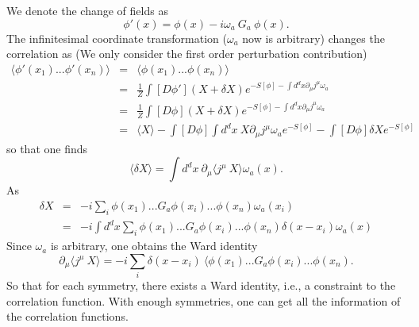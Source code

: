\documentclass[submission, PhysLectNotes]{SciPost}
\begin{document}
We denote the change of fields as
\begin{equation}
    \phi'(x) = \phi(x) -i\omega_a\ G_a\ \phi(x).
\end{equation}
The infinitesimal coordinate transformation ($\omega_a$ now is arbitrary) changes the correlation as (We only consider the first order perturbation contribution)
\begin{eqnarray}
\langle \phi'(x_1)... \phi'(x_n)\rangle &=& \langle \phi(x_1)... \phi(x_n)\rangle \\
&=& \frac{1}{Z} \int [D\phi'] (X+\delta X) e^{-S[\phi] - \int d^dx\partial_\mu j^\mu \omega_a} \\
&=& \frac{1}{Z} \int [D\phi] (X+\delta X) e^{-S[\phi] - \int d^dx\partial_\mu j^\mu \omega_a} \\
&=& \langle X \rangle - \int [D\phi] \int d^dx\ X \partial_\mu j^\mu \omega_a e^{-S[\phi]} - \int [D\phi] \delta X  e^{-S[\phi]}
\end{eqnarray}
so that one finds
\begin{equation}
    \langle\delta X\rangle = \int d^dx \ \partial_\mu\langle j^\mu \ X\rangle \omega_a(x).
\end{equation}
As
\begin{eqnarray}
\delta X &=& -i \sum_i \phi(x_1)...G_a \phi(x_i)...\phi(x_n)\omega_a(x_i) \\
&=& -i \int d^dx \sum_i \phi(x_1)...G_a \phi(x_i)...\phi(x_n)\delta(x-x_i)\omega_a(x)
\end{eqnarray}
Since $\omega_a$ is arbitrary, one obtains the Ward identity
\begin{equation}
    \partial_\mu\langle j^\mu \ X\rangle = -i \sum_i \delta(x-x_i)\ \langle \phi(x_1)...G_a \phi(x_i)...\phi(x_n).
\end{equation}
So that for each symmetry, there exists a Ward identity, i.e., a constraint to the correlation function. With enough symmetries, one can get all the information of the correlation functions.
\end{document}
